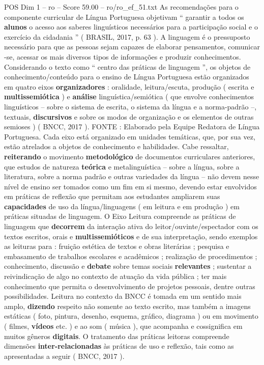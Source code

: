 \begin{textsample}{POS Dim 1 – ro – Score 59.00 – ro/ro\_ef\_51.txt}
As recomendações para o componente curricular de Língua Portuguesa objetivam “ garantir a todos os \textbf{alunos} o acesso aos saberes linguísticos necessários para a participação social e o exercício da cidadania ” ( BRASIL, 2017, p. 63 ).
A linguagem é o pressuposto necessário para que as pessoas sejam capazes de elaborar pensamentos, comunicar -se, acessar os mais diversos tipos de informações e produzir conhecimentos.
Considerando o texto como “ centro das práticas de linguagem ”, os objetos de conhecimento/conteúdo para o ensino de Língua Portuguesa estão organizados em quatro eixos \textbf{organizadores} : oralidade, leitura/escuta, produção ( escrita e \textbf{multissemiótica} ) e \textbf{análise} linguística/semiótica ( que envolve conhecimentos linguísticos – sobre o sistema de escrita, o sistema da língua e a norma-padrão –, textuais, \textbf{discursivos} e sobre os modos de organização e os elementos de outras semioses ) ( BNCC, 2017 ).
FONTE : Elaborado pela Equipe Redatora de Língua Portuguesa.
Cada eixo está organizado em unidades temáticas, que, por sua vez, estão atrelados a objetos de conhecimento e habilidades.
Cabe ressaltar, \textbf{reiterando} o movimento \textbf{metodológico} de documentos curriculares anteriores, que estudos de natureza \textbf{teórica} e metalinguística – sobre a língua, sobre a literatura, sobre a norma padrão e outras variedades da língua – não devem nesse nível de ensino ser tomados como um fim em si mesmo, devendo estar envolvidos em práticas de reflexão que permitam aos estudantes ampliarem suas \textbf{capacidades} de uso da língua/linguagens ( em leitura e em produção ) em práticas situadas de linguagem.
O Eixo Leitura compreende as práticas de linguagem que \textbf{decorrem} da interação ativa do leitor/ouvinte/espectador com os textos escritos, orais e \textbf{multissemióticos} e de sua interpretação, sendo exemplos as leituras para : fruição estética de textos e obras literárias ; pesquisa e embasamento de trabalhos escolares e acadêmicos ; realização de procedimentos ; conhecimento, discussão e \textbf{debate} sobre temas sociais \textbf{relevantes} ; sustentar a reivindicação de algo no contexto de atuação da vida pública ; ter mais conhecimento que permita o desenvolvimento de projetos pessoais, dentre outras possibilidades.
Leitura no contexto da BNCC é tomada em um sentido mais amplo, \textbf{dizendo} respeito não somente ao texto escrito, mas também a imagens estáticas ( foto, pintura, desenho, esquema, gráfico, diagrama ) ou em movimento ( filmes, \textbf{vídeos} etc. ) e ao som ( música ), que acompanha e cossignifica em muitos gêneros \textbf{digitais}.
O tratamento das práticas leitoras compreende dimensões \textbf{inter-relacionadas} às práticas de uso e reflexão, tais como as apresentadas a seguir ( BNCC, 2017 ).


\end{textsample}
